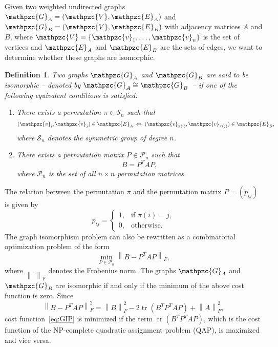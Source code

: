 \documentclass
[
    a4paper,
    DIV=11,
    abstracton
]
{scrartcl}
\newcommand{\mc}[1]{\mathpzc{#1}}
\providecommand{\norm}[1]{\left\lVert #1 \right\rVert}
\DeclareMathOperator{\tr}{tr}
\newtheorem{definition}[theorem]{Definition}
\theoremstyle{definition}
\begin{document}
Given two weighted undirected graphs $ \mc{G}_A = (\mc{V}, \mc{E}_A) $ and $ \mc{G}_B = (\mc{V}, \mc{E}_B) $ with adjacency matrices $ A $ and $ B $, where $ \mc{V} = \{ \mc{v}_1, \dots, \mc{v}_n \} $ is the set of vertices and $ \mc{E}_A $ and $ \mc{E}_B $ are the sets of edges, we want to determine whether these graphs are isomorphic.

\begin{definition}
Two graphs $ \mc{G}_A $ and $ \mc{G}_B $ are said to be \emph{isomorphic} -- denoted by $ \mc{G}_A \cong \mc{G}_B $~-- if one of the following equivalent conditions is satisfied:
\begin{enumerate}[label=\roman*)]
\item There exists a permutation $ \pi \in \mathcal{S}_n $ such that
\begin{equation*}
    (\mc{v}_i, \mc{v}_j) \in \mc{E}_A \iff (\mc{v}_{\pi(i)}, \mc{v}_{\pi(j)}) \in \mc{E}_B,
\end{equation*}
where $ \mathcal{S}_n $ denotes the symmetric group of degree $ n $.
\item There exists a permutation matrix $ P \in \mathcal{P}_n $ such that
\begin{equation*}
    B = P^T A P,
\end{equation*}
where $ \mathcal{P}_n $ is the set of all $ n \times n $ permutation matrices.
\end{enumerate}
\end{definition}

The relation between the permutation $ \pi $ and the permutation matrix $ P = (p_{ij}) $ is given by
\begin{equation*}
    p_{ij} =
    \begin{cases}
        1, & \text{if } \pi(i) = j, \\
        0, & \text{otherwise}.
    \end{cases}
\end{equation*}
The graph isomorphism problem can also be rewritten as a combinatorial optimization problem of the form
\begin{equation} \label{eq:GIP}
    \min_{P \in \mathcal{P}_n} \norm{ B - P^T A P }_F,
\end{equation}
where $ \norm{.}_F $ denotes the Frobenius norm. The graphs $ \mc{G}_A $ and $ \mc{G}_B $ are isomorphic if and only if the minimum of the above cost function is zero. Since
\begin{equation*}
    \norm{B - P^T A P}_F^2 = \norm{B}_F^2 - 2 \tr\left(B^T P^T A P \right) + \norm{A}_F^2,
\end{equation*}
cost function~\eqref{eq:GIP} is minimized if the term $ \tr\left( B^T P^T A P \right) $, which is the cost function of the NP-complete quadratic assignment problem (QAP), is maximized and vice versa.
\end{document}
